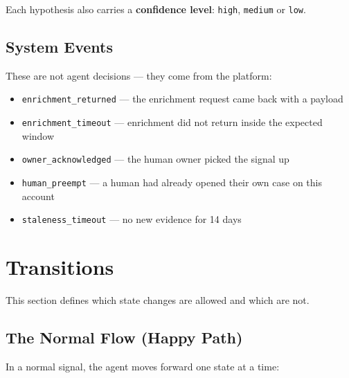 \documentclass[11pt, a4paper]{article}
\begin{document}
Each hypothesis also carries a \textbf{confidence level}: \texttt{high}, \texttt{medium} or \texttt{low}.

\subsection{System Events}

These are not agent decisions --- they come from the platform:

\begin{itemize}[nosep]
  \item \texttt{enrichment\_returned} --- the enrichment request came back with a payload
  \item \texttt{enrichment\_timeout} --- enrichment did not return inside the expected window
  \item \texttt{owner\_acknowledged} --- the human owner picked the signal up
  \item \texttt{human\_preempt} --- a human had already opened their own case on this account
  \item \texttt{staleness\_timeout} --- no new evidence for 14 days
\end{itemize}

\section{Transitions}
\label{sec:transitions}

This section defines which state changes are allowed and which are not.

\subsection{The Normal Flow (Happy Path)}

In a normal signal, the agent moves forward one state at a time:
\end{document}
